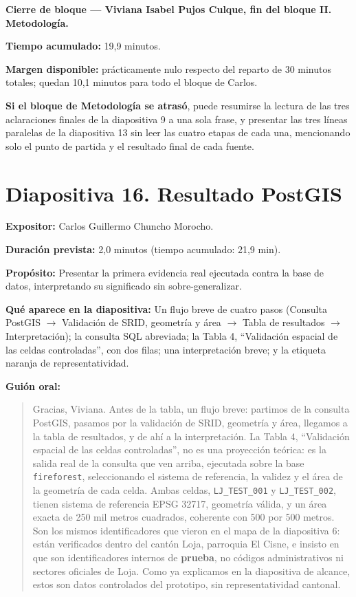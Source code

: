 \documentclass[11pt,a4paper]{article}
\newcommand{\campo}[2]{\par\medskip\noindent\textbf{#1:} #2\par}
\newenvironment{guionoral}{%
  \medskip\noindent\textbf{Gui\'on oral:}\par\smallskip
  \begin{quote}\small
}{%
  \end{quote}
}
\newenvironment{cierrebloque}[1]{%
  \begin{framed}\small\noindent\textbf{Cierre de bloque --- #1.}\par\smallskip
}{%
  \end{framed}\bigskip
}
\newcommand{\separadordiapositiva}{\bigskip\noindent{\color{Tierra!60}\hrulefill}\bigskip}
\begin{document}
\separadordiapositiva

\begin{cierrebloque}{Viviana Isabel Pujos Culque, fin del bloque II. Metodolog\'ia}
\textbf{Tiempo acumulado:} 19,9 minutos.

\textbf{Margen disponible:} pr\'acticamente nulo respecto del reparto
de 30 minutos totales; quedan 10,1 minutos para todo el bloque de
Carlos.

\textbf{Si el bloque de Metodolog\'ia se atras\'o}, puede resumirse la
lectura de las tres aclaraciones finales de la diapositiva 9 a una
sola frase, y presentar las tres l\'ineas paralelas de la diapositiva
13 sin leer las cuatro etapas de cada una, mencionando solo el punto de
partida y el resultado final de cada fuente.
\end{cierrebloque}

\section*{Diapositiva 16. Resultado PostGIS}

\campo{Expositor}{Carlos Guillermo Chuncho Morocho.}
\campo{Duraci\'on prevista}{2,0 minutos (tiempo acumulado: 21,9 min).}
\campo{Prop\'osito}{Presentar la primera evidencia real ejecutada
contra la base de datos, interpretando su significado sin
sobre-generalizar.}
\campo{Qu\'e aparece en la diapositiva}{Un flujo breve de cuatro pasos
(Consulta PostGIS $\rightarrow$ Validaci\'on de SRID, geometr\'ia y
\'area $\rightarrow$ Tabla de resultados $\rightarrow$
Interpretaci\'on); la consulta SQL abreviada; la Tabla 4, ``Validaci\'on
espacial de las celdas controladas'', con dos filas; una
interpretaci\'on breve; y la etiqueta naranja de representatividad.}

\begin{guionoral}
Gracias, Viviana. Antes de la tabla, un flujo breve: partimos de la
consulta PostGIS, pasamos por la validaci\'on de SRID, geometr\'ia y
\'area, llegamos a la tabla de resultados, y de ah\'i a la
interpretaci\'on. La Tabla 4, ``Validaci\'on espacial de las celdas
controladas'', no es una proyecci\'on te\'orica: es la salida real de
la consulta que ven arriba, ejecutada sobre la base
\texttt{fireforest}, seleccionando el sistema de referencia, la
validez y el \'area de la geometr\'ia de cada celda. Ambas celdas,
\texttt{LJ\_TEST\_001} y \texttt{LJ\_TEST\_002}, tienen sistema de
referencia EPSG 32717, geometr\'ia v\'alida, y un \'area exacta de 250
mil metros cuadrados, coherente con 500 por 500 metros. Son los mismos
identificadores que vieron en el mapa de la diapositiva 6: est\'an
verificados dentro del cant\'on Loja, parroquia El Cisne, e insisto en
que son identificadores internos de \textbf{prueba}, no c\'odigos
administrativos ni sectores oficiales de Loja. Como ya explicamos en la
diapositiva de alcance, estos son datos controlados del prototipo, sin
representatividad cantonal.
\end{guionoral}
\end{document}
